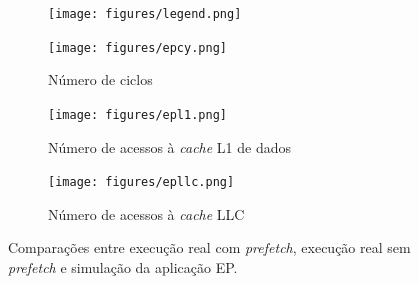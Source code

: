 \documentclass[12pt]{article}
\begin{document}
\begin{figure}[t!]
  \hspace{+25mm}
  \begin{subfigure}{0.33\textwidth}
    \centering
        \texttt{[image: figures/legend.png]}
    \label{fig:epleg}
  \end{subfigure}
  \vspace{-5mm}

  \begin{subfigure}{0.33\textwidth}
    \centering
    \vspace{-4mm}
        \texttt{[image: figures/epcy.png]}
    \caption{Número de ciclos}
    \label{fig:epcycles}
  \end{subfigure}%
  \begin{subfigure}{0.33\textwidth}
    \centering	
        \texttt{[image: figures/epl1.png]}
    \caption{Número de acessos à \textit{cache} L1 de dados}
    \label{fig:epl1}
  \end{subfigure}%
  \begin{subfigure}{0.33\textwidth}
    \centering	
        \texttt{[image: figures/epllc.png]}
    \caption{Número de acessos à \textit{cache} LLC}
    \label{fig:epllc}
  \end{subfigure}
  
  \caption{Comparações entre execução real com \textit{prefetch}, execução real sem \textit{prefetch} e simulação da aplicação EP.}
  \label{ref:ep}
\end{figure}


\end{document}
